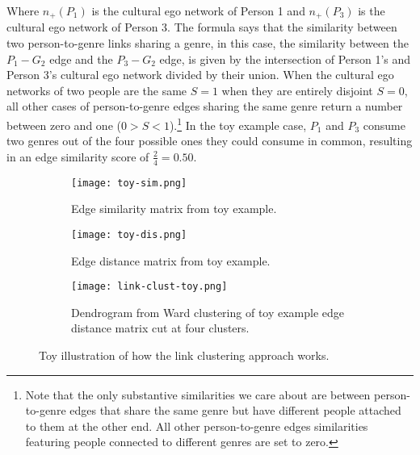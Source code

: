 \documentclass[a4paper,12pt]{article}
\begin{document}
Where $n_+(P_1)$ is the cultural ego network of Person 1 and $n_+(P_3)$ is the cultural ego network of Person 3. The formula says that the similarity between two person-to-genre links sharing a genre, in this case, the similarity between the $P_1-G_2$ edge and the $P_3-G_2$ edge, is given by the intersection of Person 1's and Person 3's cultural ego network divided by their union. When the cultural ego networks of two people are the same $S=1$ when they are entirely disjoint $S = 0$, all other cases of person-to-genre edges sharing the same genre return a number between zero and one ($0 > S < 1$).\footnote{Note that the only substantive similarities we care about are between person-to-genre edges that share the same genre but have different people attached to them at the other end. All other person-to-genre edges similarities featuring people connected to different genres are set to zero.} In the toy example case, $P_1$ and $P_3$ consume two genres out of the four possible ones they could consume in common, resulting in an edge similarity score of $\frac{2}{4} = 0.50$. 

\begin{figure}
    \captionsetup[subfigure]{font=footnotesize,labelfont=footnotesize}
    \centering
     \begin{subfigure}[b]{0.4\textwidth}
        \texttt{[image: toy-sim.png]}
        \caption{Edge similarity matrix from toy example.}
        \label{tab:toy-sim}
    \end{subfigure}
     \begin{subfigure}[b]{0.4\textwidth}
        \texttt{[image: toy-dis.png]}
        \caption{Edge distance matrix from toy example.}
        \label{tab:toy-dis}
    \end{subfigure}
     \begin{subfigure}[b]{0.6\textwidth}
        \texttt{[image: link-clust-toy.png]}
        \caption{Dendrogram from Ward clustering of toy example edge distance matrix cut at four clusters.}
        \label{fig:link-toy}
    \end{subfigure}
    \caption{Toy illustration of how the link clustering approach works.}
    \label{fig:link-toy-ex}
 \end{figure}
\end{document}
